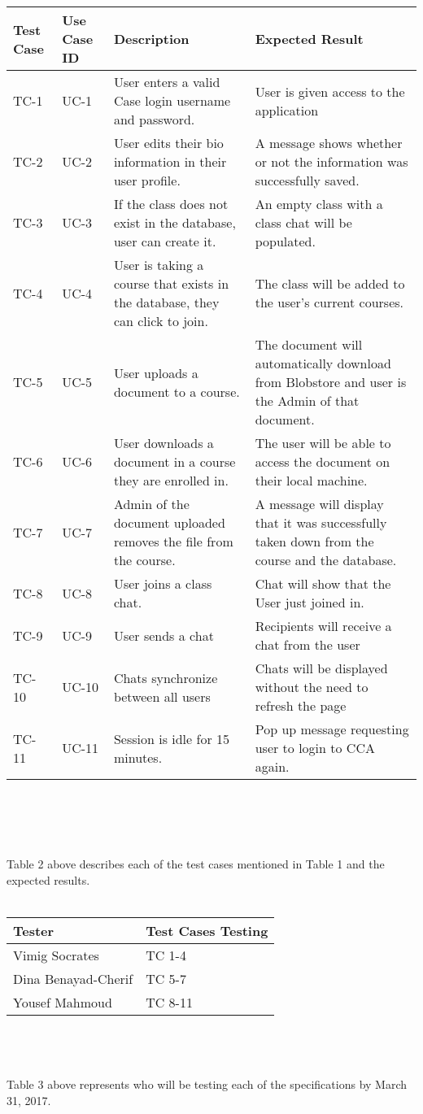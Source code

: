 \documentclass{scrreprt}
\begin{document}
\begin{tabularx}{\linewidth}{lXXX}

Test Case & Use Case ID & Description & Expected Result \\ \hline
TC-1 & UC-1 & User enters a valid Case login username and password. & User is given access to the application \\ \hline
TC-2 & UC-2 & User edits their bio information in their user profile. & A message shows whether or not the information was successfully saved. \\ \hline
TC-3 & UC-3 & If the class does not exist in the database, user can create it. & An empty class with a class chat will be populated. \\ \hline
TC-4 & UC-4 & User is taking a course that exists in the database, they can click to join. & The class will be added to the user’s current courses. \\ \hline
TC-5 & UC-5 & User uploads  a document to a course. & The document will automatically download from Blobstore and user is the Admin of that document. \\ \hline
TC-6 & UC-6 & User downloads a document in a course they are enrolled in. & The user will be able to access the document on their local machine. \\ \hline
TC-7 & UC-7 & Admin of the document uploaded removes the file from the course. & A message will display that it was successfully taken down from the course and the database. \\ \hline
TC-8 & UC-8 & User joins a class chat. & Chat will show that the User just joined in. \\ \hline
TC-9 & UC-9 & User sends a chat & Recipients will receive a chat from the user \\ \hline
TC-10 & UC-10 & Chats synchronize between all users & Chats will be displayed without the need to refresh the page \\ \hline
TC-11 & UC-11 & Session is idle for 15 minutes. & Pop up message requesting user to login to CCA again. \\ \hline
\end{tabularx}
\\
\\
\\
\\
Table 2 above describes each of the test cases mentioned in Table 1 and the expected results.
\\
\\
\begin{tabularx}{\linewidth}{lX}
Tester & Test Cases Testing \\ \hline
Vimig Socrates & TC 1-4 \\ \hline
Dina Benayad-Cherif & TC 5-7 \\ \hline
Yousef Mahmoud & TC 8-11 \\ \hline
\end{tabularx}
\\
\\
\\
Table 3 above represents who will be testing each of the specifications by March 31, 2017.
\end{document}
